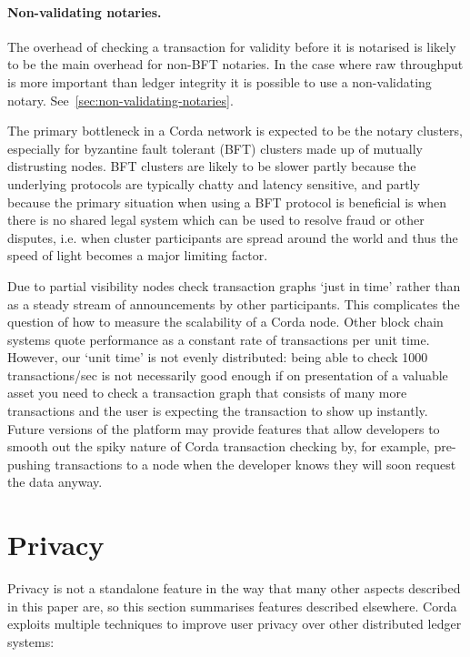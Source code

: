 \documentclass{article}
\begin{document}
\paragraph{Non-validating notaries.}The overhead of checking a transaction for validity before it is notarised is
likely to be the main overhead for non-BFT notaries. In the case where raw throughput is more important than ledger
integrity it is possible to use a non-validating notary. See~\cref{sec:non-validating-notaries}.

The primary bottleneck in a Corda network is expected to be the notary clusters, especially for byzantine fault
tolerant (BFT) clusters made up of mutually distrusting nodes. BFT clusters are likely to be slower partly because
the underlying protocols are typically chatty and latency sensitive, and partly because the primary situation when
using a BFT protocol is beneficial is when there is no shared legal system which can be used to resolve fraud or
other disputes, i.e. when cluster participants are spread around the world and thus the speed of light becomes a
major limiting factor.

Due to partial visibility nodes check transaction graphs `just in time' rather than as a steady stream of
announcements by other participants. This complicates the question of how to measure the scalability of a Corda
node. Other block chain systems quote performance as a constant rate of transactions per unit time. However, our
`unit time' is not evenly distributed: being able to check 1000 transactions/sec is not necessarily good enough if
on presentation of a valuable asset you need to check a transaction graph that consists of many more transactions
and the user is expecting the transaction to show up instantly. Future versions of the platform may provide
features that allow developers to smooth out the spiky nature of Corda transaction checking by, for example,
pre-pushing transactions to a node when the developer knows they will soon request the data anyway.

\section{Privacy}\label{sec:privacy}

Privacy is not a standalone feature in the way that many other aspects described in this paper are, so this section
summarises features described elsewhere. Corda exploits multiple techniques to improve user privacy over other
distributed ledger systems:
\end{document}
